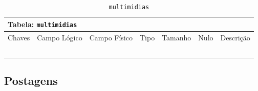 \documentclass[12pt,a4paper]{article}
\begin{document}
\begin{center}
\begin{table}[h!]
	\caption{\texttt{multimidias}}
	\label{tabela:multimidias}
	\begin{tabular}{|p{1cm}|p{1.5cm}|p{1.25cm}|p{1.25cm}|p{1.75cm}|p{1.25cm}|p{4.5cm}|}\hline	
		\multicolumn{7}{|p{16cm}|}{\cellcolor{cinzaClaro}  \centering Tabela: \texttt{multimidias}} \\ \hline %
		{\small Chaves} & {\small Campo Lógico} & {\small Campo Físico} & {\small Tipo} & {\small Tamanho} & {\small Nulo} & {\small Descrição}\\\hline %
		
		{\tiny } & {\tiny } & {\tiny } & {\tiny } & {\tiny } & {\tiny } &{\tiny }\\\hline
		{\tiny } & {\tiny } & {\tiny } & {\tiny } & {\tiny } & {\tiny } &{\tiny }\\\hline
		{\tiny } & {\tiny } & {\tiny } & {\tiny } & {\tiny } & {\tiny } &{\tiny }\\\hline
		{\tiny } & {\tiny } & {\tiny } & {\tiny } & {\tiny } & {\tiny } &{\tiny }\\\hline
		{\tiny } & {\tiny } & {\tiny } & {\tiny } & {\tiny } & {\tiny } &{\tiny }\\\hline
		
			
	\end{tabular}
\end{table}	
\end{center}

\subsection{Postagens}

\end{document}
